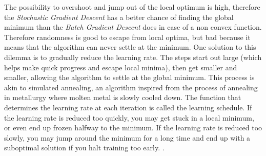\documentclass[conference]{IEEEtran}
\begin{document}
The possibility to overshoot and jump out of the local optimum is high, therefore the \textit{Stochastic Gradient Descent} has a better chance of finding the global minimum than the \textit{Batch Gradient Descent} does in case of a non convex function. 
Therefore randomness is good to escape from local optima, but bad because it means that the algorithm can never settle at the minimum. One solution to this dilemma is to gradually reduce the learning rate. The steps start out large (which helps make quick progress and escape local minima), then get smaller and smaller, allowing the algorithm to settle at the global minimum. This process is akin to simulated annealing, an algorithm inspired from the process of annealing in metallurgy where molten metal is slowly cooled down. The function that determines the learning rate at each iteration is called the learning schedule. If the learning rate is reduced too quickly, you may get stuck in a local minimum, or even end up frozen halfway to the minimum. If the learning rate is reduced too slowly, you may jump around the minimum for a long time and end up with a suboptimal solution if you halt training too early. \cite{Scikit-Learn}.
\end{document}
